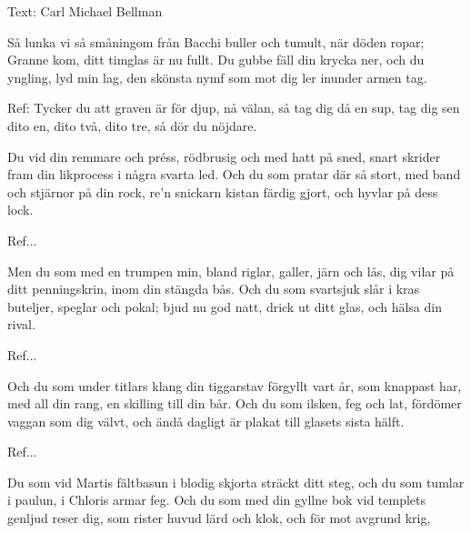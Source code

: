\begin{SongText}
\begin{SongInfo}
    Text: Carl Michael Bellman
\end{SongInfo}
\begin{SongVerse}
Så lunka vi så småningom
från Bacchi buller och tumult,
när döden ropar; Granne kom,
ditt timglas är nu fullt.
Du gubbe fäll din krycka ner,
och du yngling, lyd min lag,
den skönsta nymf som mot dig ler
inunder armen tag. 
\end{SongVerse}
\begin{SongVerse}
Ref:
Tycker du att graven är för djup,
nå välan, så tag dig då en sup,
tag dig sen dito en, dito två, dito tre,
så dör du nöjdare.
\end{SongVerse}
\begin{SongVerse}
Du vid din remmare och préss,
rödbrusig och med hatt på sned,
snart skrider fram din likprocess
i några svarta led.
Och du som pratar där så stort,
med band och stjärnor på din rock,
re’n snickarn kistan färdig gjort,
och hyvlar på dess lock. 
\end{SongVerse}
\begin{SongVerse}
Ref...
\end{SongVerse}
\begin{SongVerse}
Men du som med en trumpen min,
bland riglar, galler, järn och lås,
dig vilar på ditt penningskrin,
inom din stängda bås.
Och du som svartsjuk slår i kras
buteljer, speglar och pokal;
bjud nu god natt, drick ut ditt glas,
och hälsa din rival.
\end{SongVerse}
\begin{SongVerse}
Ref...
\end{SongVerse}
\begin{SongVerse}
Och du som under titlars klang
din tiggarstav förgyllt vart år,
som knappast har, med all din rang,
en skilling till din bår.
Och du som ilsken, feg och lat,
fördömer vaggan som dig välvt,
och ändå dagligt är plakat
till glasets sista hälft. 
\end{SongVerse}
\begin{SongVerse}
Ref...
\end{SongVerse}
\begin{SongVerse}
Du som vid Martis fältbasun
i blodig skjorta sträckt ditt steg,
och du som tumlar i paulun,
i Chloris armar feg.
Och du som med din gyllne bok
vid templets genljud reser dig,
som rister huvud lärd och klok,
och för mot avgrund krig,
\end{SongVerse}
\begin{SongVerse}

\end{SongVerse}
\end{SongText}
